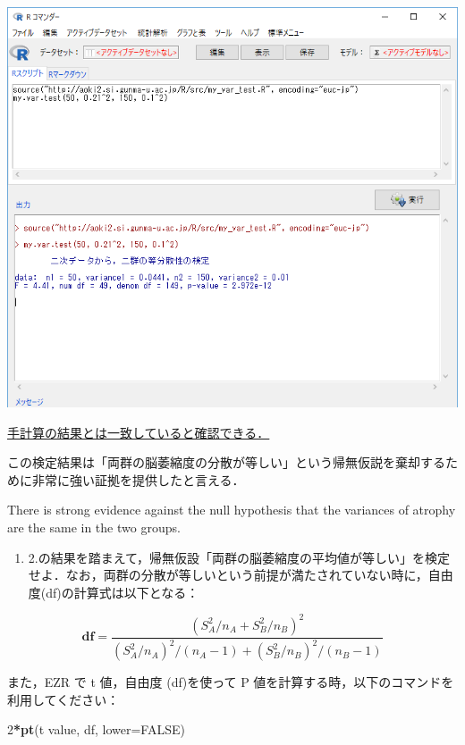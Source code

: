\documentclass[11pt,]{problemset}
\newenvironment{Shaded}{\begin{snugshade}}{\end{snugshade}}
\newcommand{\DataTypeTok}[1]{\textcolor[rgb]{0.13,0.29,0.53}{#1}}
\newcommand{\DecValTok}[1]{\textcolor[rgb]{0.00,0.00,0.81}{#1}}
\newcommand{\KeywordTok}[1]{\textcolor[rgb]{0.13,0.29,0.53}{\textbf{#1}}}
\newcommand{\NormalTok}[1]{#1}
\newcommand{\OperatorTok}[1]{\textcolor[rgb]{0.81,0.36,0.00}{\textbf{#1}}}
\newcommand{\OtherTok}[1]{\textcolor[rgb]{0.56,0.35,0.01}{#1}}
\providecommand{\tightlist}{%
  \setlength{\itemsep}{0pt}\setlength{\parskip}{0pt}}
\begin{document}
\begin{center}\includegraphics[width=0.9\linewidth]{pic/ftest01} \end{center}
\bigskip

\underline{手計算の結果とは一致していると確認できる．}

この検定結果は「両群の脳萎縮度の分散が等しい」という帰無仮説を棄却するために非常に強い証拠を提供したと言える．

There is strong evidence against the null hypothesis that the variances
of atrophy are the same in the two groups.

\newpage
\vfill

\begin{enumerate}
\def\labelenumi{\arabic{enumi}.}
\setcounter{enumi}{2}
\tightlist
\item
  2.の結果を踏まえて，帰無仮設「両群の脳萎縮度の平均値が等しい」を検定せよ．なお，両群の分散が等しいという前提が満たされていない時に，自由度(df)の計算式は以下となる：
\end{enumerate}

\begin{equation}
\label{eq:2}
\mathbf{df} = \frac{(S^2_A/n_A + S^2_B/n_B)^2}{(S_A^2/n_A)^2/(n_A-1)+(S_B^2/n_B)^2/(n_B-1)}
\end{equation}

また，EZR で t 値，自由度 (df)を使って P
値を計算する時，以下のコマンドを利用してください：

\begin{Shaded}
\begin{Highlighting}[]
\DecValTok{2}\OperatorTok{*}\KeywordTok{pt}\NormalTok{(t value, df, }\DataTypeTok{lower=}\OtherTok{FALSE}\NormalTok{)}
\end{Highlighting}
\end{Shaded}
\end{document}
